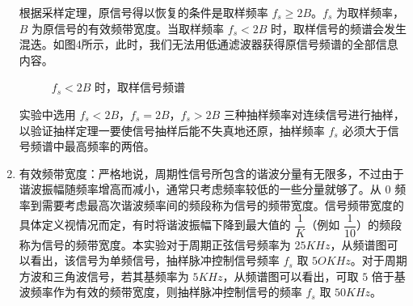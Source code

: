 \documentclass[dvipsnames, svgnames,a4paper,11pt]{article}
\begin{document}
\begin{enumerate}
  根据采样定理，原信号得以恢复的条件是取样频率 $f_s \ge 2B$。$f_s$ 为取样频率，$B$ 为原信号的有效频带宽度。当取样频率 $f_s < 2B$ 时，取样信号的频谱会发生混迭。如图4所示，此时，我们无法用低通滤波器获得原信号频谱的全部信息内容。
  
  \begin{figure}[htbp]
    \centering
    \caption{$f_s < 2B$ 时，取样信号频谱}
  \end{figure}

  实验中选用 $f_s<2B$，$f_s=2B$，$f_s > 2B$ 三种抽样频率对连续信号进行抽样，以验证抽样定理一要使信号抽样后能不失真地还原，抽样频率 $f_s$ 必须大于信号频谱中最高频率的两倍。

  \item 有效频带宽度：严格地说，周期性信号所包含的谐波分量有无限多，不过由于谐波振幅随频率增高而减小，通常只考虑频率较低的一些分量就够了。从 $0$ 频率到需要考虑最高次谐波频率间的频段称为信号的频带宽度。信号频带宽度的具体定义视情况而定，有时将谐波振幅下降到最大值的 $\dfrac{1}{K}$（例如 $\dfrac{1}{10}$）的频段称为信号的频带宽度。本实验对于周期正弦信号频率为 $25KHz$，从频谱图可以看出，该信号为单频信号，抽样脉冲控制信号频率 $f_s$ 取 $5OKHz$。对于周期方波和三角波信号，若其基频率为 $5KHz$，从频谱图可以看出，可取 $5$ 倍于基波频率作为有效的频带宽度，则抽样脉冲控制信号的频率 $f_s$ 取 $50KHz$。
  
\end{enumerate}
\end{document}
